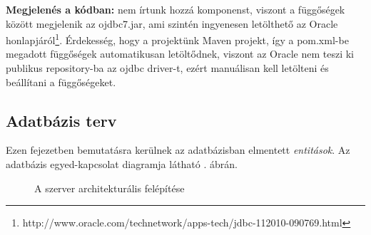 \documentclass[11pt, a4paper]{article}
\begin{document}
   \textbf{ Megjelenés a kódban:} nem írtunk hozzá komponenst, viszont a függőségek között megjelenik az ojdbc7.jar, ami szintén ingyenesen letölthető az Oracle honlapjáról\footnote{http://www.oracle.com/technetwork/apps-tech/jdbc-112010-090769.html}. Érdekesség, hogy a projektünk Maven projekt, így a pom.xml-be megadott függőségek automatikusan letöltődnek, viszont az Oracle nem teszi ki publikus repository-ba az ojdbc driver-t, ezért manuálisan kell letölteni és beállítani a függőségeket.
    
    \subsection{Adatbázis terv}
    Ezen fejezetben bemutatásra kerülnek az adatbázisban elmentett \emph{entitások}. Az adatbázis egyed-kapcsolat diagramja látható . ábrán.
    
    \begin{figure}[htbp]
    	\center
    	\caption{A szerver architekturális felépítése}
    	\label{fig:er_diag}
    \end{figure}
    
\end{document}
